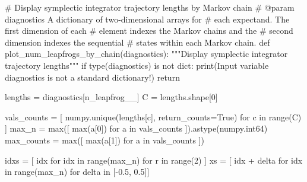 \documentclass[
  letterpaper,
  DIV=11,
  numbers=noendperiod]{scrartcl}
\newenvironment{Shaded}{\begin{snugshade}}{\end{snugshade}}
\newcommand{\BuiltInTok}[1]{\textcolor[rgb]{0.00,0.23,0.31}{#1}}
\newcommand{\CommentTok}[1]{\textcolor[rgb]{0.37,0.37,0.37}{#1}}
\newcommand{\ControlFlowTok}[1]{\textcolor[rgb]{0.00,0.23,0.31}{#1}}
\newcommand{\DecValTok}[1]{\textcolor[rgb]{0.68,0.00,0.00}{#1}}
\newcommand{\FloatTok}[1]{\textcolor[rgb]{0.68,0.00,0.00}{#1}}
\newcommand{\KeywordTok}[1]{\textcolor[rgb]{0.00,0.23,0.31}{#1}}
\newcommand{\NormalTok}[1]{\textcolor[rgb]{0.00,0.23,0.31}{#1}}
\newcommand{\OperatorTok}[1]{\textcolor[rgb]{0.37,0.37,0.37}{#1}}
\newcommand{\StringTok}[1]{\textcolor[rgb]{0.13,0.47,0.30}{#1}}
\newcommand{\VariableTok}[1]{\textcolor[rgb]{0.07,0.07,0.07}{#1}}
\begin{document}
\begin{Shaded}
\begin{Highlighting}[]
\CommentTok{\# Display symplectic integrator trajectory lengths by Markov chain}
\CommentTok{\# @param diagnostics A dictionary of two{-}dimensional arrays for }
\CommentTok{\#                    each expectand.  The first dimension of each}
\CommentTok{\#                    element indexes the Markov chains and the }
\CommentTok{\#                    second dimension indexes the sequential }
\CommentTok{\#                    states within each Markov chain.}
\KeywordTok{def}\NormalTok{ plot\_num\_leapfrogs\_by\_chain(diagnostics):}
  \CommentTok{"""Display symplectic integrator trajectory lengths"""}
  \ControlFlowTok{if} \BuiltInTok{type}\NormalTok{(diagnostics) }\KeywordTok{is} \KeywordTok{not} \BuiltInTok{dict}\NormalTok{:}
    \BuiltInTok{print}\NormalTok{(}\StringTok{\textquotesingle{}Input variable \textasciigrave{}diagnostics\textasciigrave{} is not a standard dictionary!\textquotesingle{}}\NormalTok{)}
    \ControlFlowTok{return}
  
\NormalTok{  lengths }\OperatorTok{=}\NormalTok{ diagnostics[}\StringTok{\textquotesingle{}n\_leapfrog\_\_\textquotesingle{}}\NormalTok{]}
\NormalTok{  C }\OperatorTok{=}\NormalTok{ lengths.shape[}\DecValTok{0}\NormalTok{]}
  
\NormalTok{  vals\_counts }\OperatorTok{=}\NormalTok{ [ numpy.unique(lengths[c], return\_counts}\OperatorTok{=}\VariableTok{True}\NormalTok{) }
                  \ControlFlowTok{for}\NormalTok{ c }\KeywordTok{in} \BuiltInTok{range}\NormalTok{(C) ] }
\NormalTok{  max\_n }\OperatorTok{=} \BuiltInTok{max}\NormalTok{([ }\BuiltInTok{max}\NormalTok{(a[}\DecValTok{0}\NormalTok{]) }\ControlFlowTok{for}\NormalTok{ a }\KeywordTok{in}\NormalTok{ vals\_counts ]).astype(numpy.int64)}
\NormalTok{  max\_counts }\OperatorTok{=} \BuiltInTok{max}\NormalTok{([ }\BuiltInTok{max}\NormalTok{(a[}\DecValTok{1}\NormalTok{]) }\ControlFlowTok{for}\NormalTok{ a }\KeywordTok{in}\NormalTok{ vals\_counts ])}
  
\NormalTok{  idxs }\OperatorTok{=}\NormalTok{ [ idx }\ControlFlowTok{for}\NormalTok{ idx }\KeywordTok{in} \BuiltInTok{range}\NormalTok{(max\_n) }\ControlFlowTok{for}\NormalTok{ r }\KeywordTok{in} \BuiltInTok{range}\NormalTok{(}\DecValTok{2}\NormalTok{) ]}
\NormalTok{  xs }\OperatorTok{=}\NormalTok{ [ idx }\OperatorTok{+}\NormalTok{ delta }\ControlFlowTok{for}\NormalTok{ idx }\KeywordTok{in} \BuiltInTok{range}\NormalTok{(max\_n) }\ControlFlowTok{for}\NormalTok{ delta }\KeywordTok{in}\NormalTok{ [}\OperatorTok{{-}}\FloatTok{0.5}\NormalTok{, }\FloatTok{0.5}\NormalTok{]]}
  

\end{Highlighting}
\end{Shaded}
\end{document}
